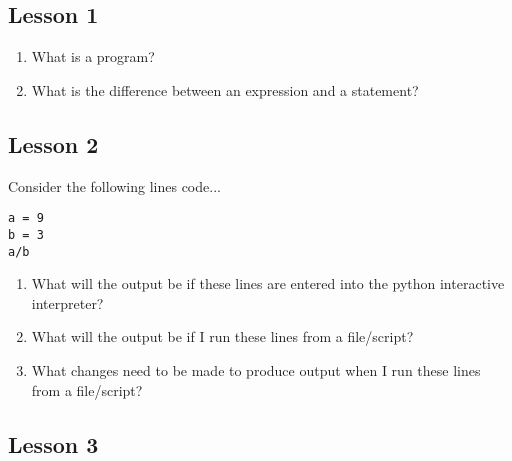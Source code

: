\subsection{Lesson 1}

\begin{enumerate}
	\item What is a program?
	\item What is the difference between an expression and a    statement?
\end{enumerate}

\subsection{Lesson 2}


Consider the following lines code...
\begin{lstlisting}
a = 9
b = 3
a/b\end{lstlisting}
\begin{enumerate}
	\item What will the output be if these lines are entered into the     python interactive interpreter?
	\item What will the output be if I run these lines from a     file/script?
	\item What changes need to be made to produce output when I run     these lines from a file/script?
\end{enumerate}

\subsection{Lesson 3}



